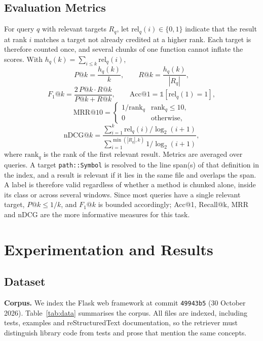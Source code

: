 \documentclass[conference]{IEEEtran}
\begin{document}
\subsection{Evaluation Metrics}
For query $q$ with relevant targets $R_q$, let $\text{rel}_q(i) \in \{0,1\}$
indicate that the result at rank $i$ matches a target not already credited at a
higher rank. Each target is therefore counted once, and several chunks of one
function cannot inflate the scores. With $h_q(k) = \sum_{i \le k}\text{rel}_q(i)$,
\begin{equation}
  P@k = \frac{h_q(k)}{k},\qquad R@k = \frac{h_q(k)}{|R_q|},
\end{equation}
\begin{equation}
  F_1@k = \frac{2\,P@k\cdot R@k}{P@k + R@k},\qquad
  \text{Acc}@1 = \mathbb{1}[\text{rel}_q(1) = 1],
\end{equation}
\begin{equation}
  \text{MRR}@10 = \begin{cases} 1/\text{rank}_q & \text{rank}_q \le 10,\\ 0 & \text{otherwise,}\end{cases}
\end{equation}
\begin{equation}
  \text{nDCG}@k = \frac{\sum_{i=1}^{k} \text{rel}_q(i)/\log_2(i+1)}{\sum_{i=1}^{\min(|R_q|,k)} 1/\log_2(i+1)},
\end{equation}
where $\text{rank}_q$ is the rank of the first relevant result. Metrics are
averaged over queries. A target \texttt{path::Symbol} is resolved to the line
span(s) of that definition in the index, and a result is relevant if it lies in
the same file and overlaps the span. A label is therefore valid regardless of
whether a method is chunked alone, inside its class or across several windows.
Since most queries have a single relevant target, $P@k \le 1/k$, and $F_1@k$
is bounded accordingly; Acc@1, Recall@k, MRR and nDCG are the more informative
measures for this task.

\section{Experimentation and Results}

\subsection{Dataset}
\textbf{Corpus.} We index the Flask web framework at commit
\texttt{49943b5} (30 October 2026). Table~\ref{tab:data} summarises the corpus.
All files are indexed, including tests, examples and reStructuredText
documentation, so the retriever must distinguish library code from tests and
prose that mention the same concepts.
\end{document}
